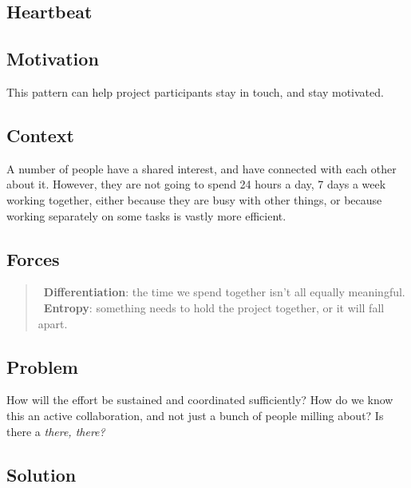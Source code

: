 \hypertarget{heartbeat}{%
\subsection{Heartbeat}\label{heartbeat}}

\hypertarget{motivation}{%
\subsection{Motivation}\label{motivation}}

This pattern can help project participants stay in touch, and stay
motivated.

\hypertarget{context}{%
\subsection{Context}\label{context}}

A number of people have a shared interest, and have connected with each
other about it. However, they are not going to spend 24 hours a day, 7
days a week working together, either because they are busy with other
things, or because working separately on some tasks is vastly more
efficient.

\hypertarget{forces}{%
\subsection{Forces}\label{forces}}

\begin{quote}
\Sdifferentiation\ \textbf{Differentiation}:
the time we spend together isn't all equally meaningful.\\
\Sentropy\ \textbf{Entropy}: something needs
to hold the project together, or it will fall apart.
\end{quote}

\hypertarget{problem}{%
\subsection{Problem}\label{problem}}

How will the effort be sustained and coordinated sufficiently? How do we
know this an active collaboration, and not just a bunch of people
milling about? Is there a \emph{there, there?}

\hypertarget{solution}{%
\subsection{Solution}\label{solution}}

